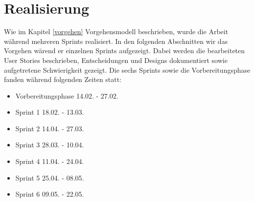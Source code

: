\chapter{Realisierung}

Wie im Kapitel \ref{vorgehen} Vorgehensmodell beschrieben, wurde die Arbeit während mehreren Sprints realisiert.
In den folgenden Abschnitten wir das Vorgehen wärend er einzelnen Sprints aufgezeigt.
Dabei werden die bearbeiteten User Stories beschrieben, Entscheidungen und Designs dokumentiert sowie aufgetretene Schwierigkeit gezeigt.
Die sechs Sprints sowie die Vorbereitungsphase fanden während folgenden Zeiten statt:

\begin{itemize}
   \item Vorbereitungsphase 14.02. - 27.02.
   \item Sprint 1 18.02. - 13.03.
   \item Sprint 2 14.04. - 27.03.
   \item Sprint 3 28.03. - 10.04.
   \item Sprint 4 11.04. - 24.04.
   \item Sprint 5 25.04. - 08.05.
   \item Sprint 6 09.05. - 22.05.
\end{itemize}


\newpage


\newpage

\newpage

\newpage

\newpage

\newpage

\newpage